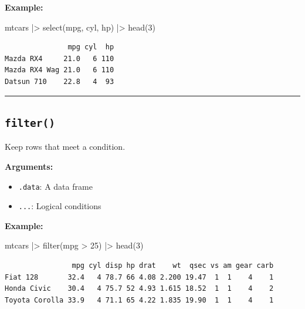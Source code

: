 \documentclass[
  letterpaper,
  DIV=11,
  numbers=noendperiod]{scrreprt}
\newenvironment{Shaded}{\begin{snugshade}}{\end{snugshade}}
\newcommand{\DecValTok}[1]{\textcolor[rgb]{0.68,0.00,0.00}{#1}}
\newcommand{\FunctionTok}[1]{\textcolor[rgb]{0.28,0.35,0.67}{#1}}
\newcommand{\NormalTok}[1]{\textcolor[rgb]{0.00,0.23,0.31}{#1}}
\newcommand{\SpecialCharTok}[1]{\textcolor[rgb]{0.37,0.37,0.37}{#1}}
\providecommand{\tightlist}{%
  \setlength{\itemsep}{0pt}\setlength{\parskip}{0pt}}
\begin{document}
\textbf{Example:}

\begin{Shaded}
\begin{Highlighting}[]
\NormalTok{mtcars }\SpecialCharTok{|\textgreater{}}
  \FunctionTok{select}\NormalTok{(mpg, cyl, hp) }\SpecialCharTok{|\textgreater{}}
  \FunctionTok{head}\NormalTok{(}\DecValTok{3}\NormalTok{)}
\end{Highlighting}
\end{Shaded}

\begin{verbatim}
               mpg cyl  hp
Mazda RX4     21.0   6 110
Mazda RX4 Wag 21.0   6 110
Datsun 710    22.8   4  93
\end{verbatim}

\begin{center}\rule{0.5\linewidth}{0.5pt}\end{center}

\subsection{\texorpdfstring{\texttt{filter()}}{filter()}}\label{filter}

Keep rows that meet a condition.

\textbf{Arguments:}

\begin{itemize}
\tightlist
\item
  \texttt{.data}: A data frame
\item
  \texttt{...}: Logical conditions
\end{itemize}

\textbf{Example:}

\begin{Shaded}
\begin{Highlighting}[]
\NormalTok{mtcars }\SpecialCharTok{|\textgreater{}}
  \FunctionTok{filter}\NormalTok{(mpg }\SpecialCharTok{\textgreater{}} \DecValTok{25}\NormalTok{) }\SpecialCharTok{|\textgreater{}}
  \FunctionTok{head}\NormalTok{(}\DecValTok{3}\NormalTok{)}
\end{Highlighting}
\end{Shaded}

\begin{verbatim}
                mpg cyl disp hp drat    wt  qsec vs am gear carb
Fiat 128       32.4   4 78.7 66 4.08 2.200 19.47  1  1    4    1
Honda Civic    30.4   4 75.7 52 4.93 1.615 18.52  1  1    4    2
Toyota Corolla 33.9   4 71.1 65 4.22 1.835 19.90  1  1    4    1
\end{verbatim}
\end{document}
